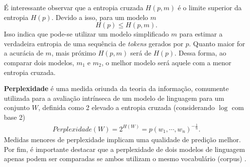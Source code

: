 \documentclass{automatextcc}
\begin{document}
É interessante observar que a entropia cruzada $H(p,m)$ é o limite superior da entropia $H(p)$. Devido a isso, para um modelo $m$
\begin{equation}
    H(p) \leq H(p,m).
\end{equation}
Isso indica que pode-se utilizar um modelo simplificado $m$ para estimar a verdadeira entropia de uma sequência de \textit{tokens} gerados por $p$. Quanto maior for a acurácia de $m$, mais próximo $H(p,m)$ será de $H(p)$. Dessa forma, ao comparar dois modelos, $m_1$ e $m_2$, o melhor modelo será aquele com a menor entropia cruzada.

\textbf{Perplexidade} é uma medida oriunda da teoria da informação, comumente utilizada para a avaliação intrínseca de um modelo de linguagem para um conjunto $W$, definida como 2 elevado a entropia cruzada (considerando $\log$ com base 2)
\begin{align*}
    Perplexidade(W)  = 2^{H(W)}  = p(w_1,\cdots,w_n)^{-\frac{1}{n}}.
\end{align*}
Medidas menores de perplexidade implicam uma qualidade de predição melhor. Por fim, é importante destacar que a perplexidade de dois modelos de linguagem apenas podem ser comparadas se ambos utilizam o mesmo vocabulário (corpus) \citep{manning1999, kamath2019, jurafsky2021}.





\end{document}
